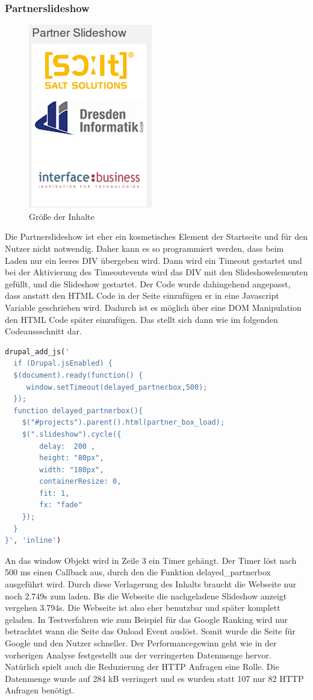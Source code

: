 \subsubsection{Partnerslideshow}
\begin{figure}[htbp]
  \centering
  \includegraphics[scale=0.5]{material/partner_slideshow.png}
  \caption{Größe der Inhalte}
  \label{fig:startbyte}
\end{figure} Die Partnerslideshow ist eher ein kosmetisches Element der Startseite und für den Nutzer nicht notwendig. Daher kann es so programmiert werden, dass beim Laden nur ein leeres DIV übergeben wird. Dann wird ein Timeout gestartet und bei der Aktivierung des Timeoutevents wird das DIV mit den Slideshowelementen gefüllt, und die Slideshow gestartet. Der Code wurde dahingehend angepasst, dass anstatt den HTML Code in der Seite einzufügen er in eine Javascript Variable geschrieben wird. Dadurch ist es möglich über eine DOM Manipulation den HTML Code später einzufügen. Das stellt sich dann wie im folgenden Codeaussschnitt dar.
\begin{lstlisting}[language=php,label=Javascript - Slideshow,caption=Javascript - Slideshow]
drupal_add_js('
  if (Drupal.jsEnabled) {
  $(document).ready(function() {
     window.setTimeout(delayed_partnerbox,500);
  });
  function delayed_partnerbox(){
	$("#projects").parent().html(partner_box_load);
	$(".slideshow").cycle({
	    delay:  200 ,
	    height: "80px",
	    width: "180px",
	    containerResize: 0,
	    fit: 1,
	    fx: "fade"
	});
  }
}', 'inline')
\end{lstlisting}
An das window Objekt wird in Zeile 3 ein Timer gehängt. Der Timer löst nach 500 ms einen Callback aus, durch den die Funktion delayed\_partnerbox ausgeführt wird. Durch diese Verlagerung des Inhalts braucht die Webseite nur noch 2.749s zum laden. Bis die Webseite die nachgeladene Slideshow anzeigt vergehen 3.794s. Die Webseite ist also eher benutzbar und später komplett geladen. In Testverfahren wie zum Beispiel für das Google Ranking wird nur betrachtet wann die Seite das Onload Event auslöst. Somit wurde die Seite für Google und den Nutzer schneller. Der Performancegewinn geht wie in der vorherigen Analyse festgestellt aus der verringerten Datenmenge hervor. Natürlich spielt auch die Reduzierung der HTTP Anfragen eine Rolle. Die Datenmenge wurde auf 284 kB verringert und es wurden statt 107 nur 82 HTTP Anfragen benötigt.
